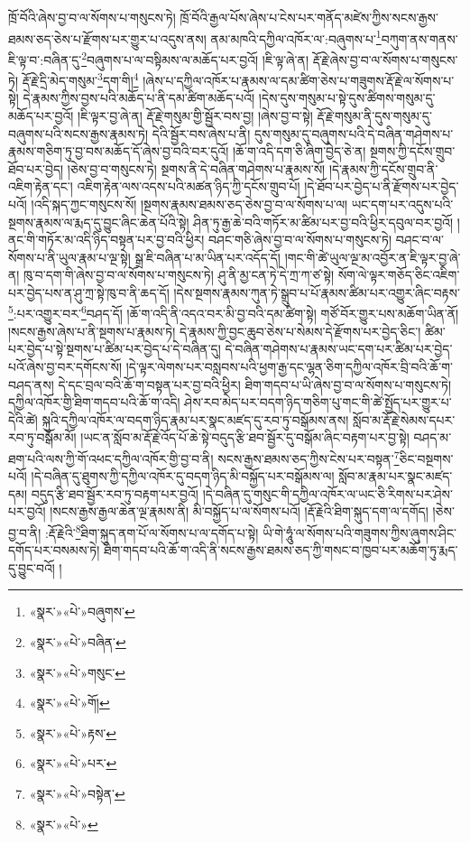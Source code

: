 ཁྲོ་བོའི་ཞེས་བྱ་བ་ལ་སོགས་པ་གསུངས་ཏེ། ཁྲོ་བོའི་རྒྱལ་པོས་ཞེས་པ་ངེས་པར་གནོད་མཛེས་ཀྱིས་སངས་རྒྱས་ཐམས་ཅད་ཅེས་པ་རྫོགས་པར་གྱུར་པ་འདུས་ནས། ནམ་མཁའི་དཀྱིལ་འཁོར་ལ་:བཞུགས་པ་\footnote{«སྣར་»«པེ་»བཞུགས་}བཀུག་ནས་གནས་ཇི་ལྟ་བ་:བཞིན་དུ་\footnote{«སྣར་»«པེ་»བཞིན་}བཞུགས་པ་ལ་བསྟིམས་ལ་མཆོད་པར་བྱའོ། །ཇི་ལྟ་ཞེ་ན། རྡོ་རྗེ་ཞེས་བྱ་བ་ལ་སོགས་པ་གསུངས་ཏེ། རྡོ་རྗེ་དྲི་མེད་གསུམ་\footnote{«སྣར་»«པེ་»གསུང་}དག་གི།\footnote{«སྣར་»«པེ་»གོ།} །ཞེས་པ་དཀྱིལ་འཁོར་པ་རྣམས་ལ་དམ་ཚིག་ཅེས་པ་གཟུགས་རྡོ་རྗེ་ལ་སོགས་པ་སྟེ། དེ་རྣམས་ཀྱིས་བྱས་པའི་མཆོད་པ་ནི་དམ་ཚིག་མཆོད་པའོ། །དེས་དུས་གསུམ་པ་སྟེ་དུས་ཚིགས་གསུམ་དུ་མཆོད་པར་བྱའོ། །ཇི་ལྟར་བྱ་ཞེ་ན། རྡོ་རྗེ་གསུམ་གྱི་སྦྱོར་བས་བྱ། །ཞེས་བྱ་བ་སྟེ། རྡོ་རྗེ་གསུམ་ནི་དུས་གསུམ་དུ་བཞུགས་པའི་སངས་རྒྱས་རྣམས་ཏེ། དེའི་སྦྱོར་བས་ཞེས་པ་ནི། དུས་གསུམ་དུ་བཞུགས་པའི་དེ་བཞིན་གཤེགས་པ་རྣམས་གཅིག་ཏུ་བྱ་བས་མཆོད་དོ་ཞེས་བྱ་བའི་བར་དུའོ། །ཆོ་ག་འདི་དག་ཅི་ཞིག་བྱེད་ཅེ་ན། སྔགས་ཀྱི་དངོས་གྲུབ་ཐོབ་པར་བྱེད། །ཅེས་བྱ་བ་གསུངས་ཏེ། སྔགས་ནི་དེ་བཞིན་གཤེགས་པ་རྣམས་སོ། །དེ་རྣམས་ཀྱི་དངོས་གྲུབ་ནི་འཇིག་རྟེན་དང་། འཇིག་རྟེན་ལས་འདས་པའི་མཚན་ཉིད་ཀྱི་དངོས་གྲུབ་པོ། །དེ་ཐོབ་པར་བྱེད་པ་ནི་རྫོགས་པར་བྱེད་པའོ། །འདི་སྐད་ཀྱང་གསུངས་སོ། །སྔགས་རྣམས་ཐམས་ཅད་ཅེས་བྱ་བ་ལ་སོགས་པ་ལ། ཡང་དག་པར་འདུས་པའི་སྔགས་རྣམས་ལ་རྨད་དུ་བྱུང་ཞིང་ཆེན་པོའི་སྟེ། ཤིན་ཏུ་རྒྱ་ཆེ་བའི་གཏོར་མ་ཚིམ་པར་བྱ་བའི་ཕྱིར་དབུལ་བར་བྱའོ། །ནང་གི་གཏོར་མ་འདི་ཉིད་བསྟན་པར་བྱ་བའི་ཕྱིར། བཤང་གཅི་ཞེས་བྱ་བ་ལ་སོགས་པ་གསུངས་ཏེ། བཤང་བ་ལ་སོགས་པ་ནི་ཡུལ་རྣམ་པ་ལྔ་སྟེ། སྒྲ་ཇི་བཞིན་པ་མ་ཡིན་པར་འདོད་དོ། །གང་གི་ཚེ་ཡུལ་ལྔ་མ་འབྱོར་ན་ཇི་ལྟར་བྱ་ཞེ་ན། ཁུ་བ་དག་གི་ཞེས་བྱ་བ་ལ་སོགས་པ་གསུངས་ཏེ། ཤུ་ནི་མྱ་ངན་ཏེ་དེ་ཀྲ་ཀ་ཙ་སྟེ། སོག་ལེ་ལྟར་གཅོད་ཅིང་འཇིག་པར་བྱེད་པས་ན་ཤུ་ཀྲ་སྟེ་ཁུ་བ་ནི་ཆད་དོ། །དེས་སྔགས་རྣམས་ཀུན་ཏེ་སྒྲུབ་པ་པོ་རྣམས་ཚིམ་པར་འགྱུར་ཞིང་བརྟས་\footnote{«སྣར་»«པེ་»རྟས་}:པར་འགྱུར་བར་\footnote{«སྣར་»«པེ་»པར་}བཤད་དོ། །ཆོ་ག་འདི་ནི་འདའ་བར་མི་བྱ་བའི་དམ་ཚིག་སྟེ། གཙོ་བོར་གྱུར་པས་མཆོག་ཡིན་ནོ། །སངས་རྒྱས་ཞེས་པ་ནི་སྔགས་པ་རྣམས་ཏེ། དེ་རྣམས་ཀྱི་བྱང་ཆུབ་ཅེས་པ་སེམས་དེ་རྫོགས་པར་བྱེད་ཅིང་། ཚིམ་པར་བྱེད་པ་སྟེ་སྔགས་པ་ཚིམ་པར་བྱེད་པ་དེ་བཞིན་དུ། དེ་བཞིན་གཤེགས་པ་རྣམས་ཡང་དག་པར་ཚིམ་པར་བྱེད་པའོ་ཞེས་བྱ་བར་དགོངས་སོ། །དེ་ལྟར་ལེགས་པར་བསླབས་པའི་ཕྱག་རྒྱ་དང་ལྷན་ཅིག་དཀྱིལ་འཁོར་བྲི་བའི་ཆོ་ག་བཤད་ནས། དེ་དང་བྲལ་བའི་ཆོ་ག་བསྟན་པར་བྱ་བའི་ཕྱིར། ཐིག་གདབ་པ་ཡི་ཞེས་བྱ་བ་ལ་སོགས་པ་གསུངས་ཏེ། དཀྱིལ་འཁོར་གྱི་ཐིག་གདབ་པའི་ཆོ་ག་འདི། ཤེས་རབ་མེད་པར་བདག་ཉིད་གཅིག་པུ་གང་གི་ཚེ་སྤྱོད་པར་གྱུར་པ་དེའི་ཚེ། སྐུའི་དཀྱིལ་འཁོར་ལ་བདག་ཉིད་རྣམ་པར་སྣང་མཛད་དུ་རབ་ཏུ་བསྒོམས་ནས། སློབ་མ་རྡོ་རྗེ་སེམས་དཔར་རབ་ཏུ་བསྒོམ་མོ། །ཡང་ན་སློབ་མ་རྡོ་རྗེ་འོད་པོ་ཆེ་སྟེ་བདུད་རྩི་ཐབ་སྦྱོར་དུ་བསྒོམ་ཞིང་བརྟག་པར་བྱ་སྟེ། བཤད་མ་ཐག་པའི་ལས་ཀྱི་གོ་འཕང་དཀྱིལ་འཁོར་གྱི་བྱ་བ་ནི། སངས་རྒྱས་ཐམས་ཅད་ཀྱིས་ངེས་པར་བསྟན་\footnote{«སྣར་»«པེ་»བསྟེན་}ཅིང་བསྔགས་པའོ། །དེ་བཞིན་དུ་ཐུགས་ཀྱི་དཀྱིལ་འཁོར་དུ་བདག་ཉིད་མི་བསྐྱོད་པར་བསྒོམས་ལ། སློབ་མ་རྣམ་པར་སྣང་མཛད་དམ། བདུད་རྩི་ཐབ་སྦྱོར་རབ་ཏུ་བརྟག་པར་བྱའོ། །དེ་བཞིན་དུ་གསུང་གི་དཀྱིལ་འཁོར་ལ་ཡང་ཅི་རིགས་པར་ཤེས་པར་བྱའོ། །སངས་རྒྱས་རྒྱལ་ཆེན་ལྔ་རྣམས་ནི། མི་བསྐྱོད་པ་ལ་སོགས་པའོ། །རྡོ་རྗེའི་ཐིག་སྐུད་དག་ལ་དགོད། །ཅེས་བྱ་བ་ནི། :རྡོ་རྗེའི་\footnote{«སྣར་»«པེ་»}ཐིག་སྐུད་ནག་པོ་ལ་སོགས་པ་ལ་དགོད་པ་སྟེ། ཡི་གེ་ཧཱུཾ་ལ་སོགས་པའི་གཟུགས་ཀྱིས་ཞུགས་ཤིང་དགོད་པར་བསམས་ཏེ། ཐིག་གདབ་པའི་ཆོ་ག་འདི་ནི་སངས་རྒྱས་ཐམས་ཅད་ཀྱི་གསང་བ་ཁྱབ་པར་མཆོག་ཏུ་རྨད་དུ་བྱུང་བའོ། །
